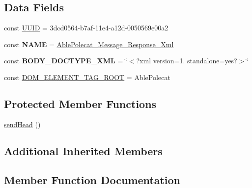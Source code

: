 \subsection*{Data Fields}
\begin{DoxyCompactItemize}
\item 
const \hyperlink{class_able_polecat___message___response___xml_a74b892c8c0b86bf9d04c5819898c51e7}{U\+U\+I\+D} = \textquotesingle{}3dcd0564-\/b7af-\/11e4-\/a12d-\/0050569e00a2\textquotesingle{}
\item 
\hypertarget{class_able_polecat___message___response___xml_a244352f035b82b20b0efa506167fd862}{}const {\bfseries N\+A\+M\+E} = \textquotesingle{}\hyperlink{class_able_polecat___message___response___xml}{Able\+Polecat\+\_\+\+Message\+\_\+\+Response\+\_\+\+Xml}\textquotesingle{}\label{class_able_polecat___message___response___xml_a244352f035b82b20b0efa506167fd862}

\item 
\hypertarget{class_able_polecat___message___response___xml_a9516b0abef74d1751ee087a0041d2a79}{}const {\bfseries B\+O\+D\+Y\+\_\+\+D\+O\+C\+T\+Y\+P\+E\+\_\+\+X\+M\+L} = \char`\"{}$<$?xml version=\textquotesingle{}1.\textquotesingle{} standalone=\textquotesingle{}yes\textquotesingle{}?$>$\char`\"{}\label{class_able_polecat___message___response___xml_a9516b0abef74d1751ee087a0041d2a79}

\item 
const \hyperlink{class_able_polecat___message___response___xml_ad23b3bef9ea0d362212e78bc8d37d629}{D\+O\+M\+\_\+\+E\+L\+E\+M\+E\+N\+T\+\_\+\+T\+A\+G\+\_\+\+R\+O\+O\+T} = \textquotesingle{}Able\+Polecat\textquotesingle{}
\end{DoxyCompactItemize}
\subsection*{Protected Member Functions}
\begin{DoxyCompactItemize}
\item 
\hyperlink{class_able_polecat___message___response___xml_a9fbf1cb2098810d8b43b4f7d68f64bfc}{send\+Head} ()
\end{DoxyCompactItemize}
\subsection*{Additional Inherited Members}


\subsection{Member Function Documentation}
\hypertarget{class_able_polecat___message___response___xml_a239b1c70258014a86569483c2d009de6}{}
